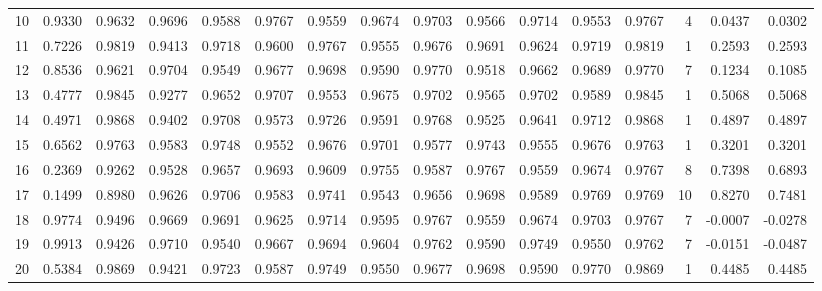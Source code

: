 \begin{tabular}{lrrrrrrrrrrrrrrr}
10  &      0.9330 &  0.9632 &  0.9696 &  0.9588 &  0.9767 &  0.9559 &  0.9674 &  0.9703 &  0.9566 &  0.9714 &   0.9553 &     0.9767 &      4 &                    0.0437 &                     0.0302 \\
11  &      0.7226 &  0.9819 &  0.9413 &  0.9718 &  0.9600 &  0.9767 &  0.9555 &  0.9676 &  0.9691 &  0.9624 &   0.9719 &     0.9819 &      1 &                    0.2593 &                     0.2593 \\
12  &      0.8536 &  0.9621 &  0.9704 &  0.9549 &  0.9677 &  0.9698 &  0.9590 &  0.9770 &  0.9518 &  0.9662 &   0.9689 &     0.9770 &      7 &                    0.1234 &                     0.1085 \\
13  &      0.4777 &  0.9845 &  0.9277 &  0.9652 &  0.9707 &  0.9553 &  0.9675 &  0.9702 &  0.9565 &  0.9702 &   0.9589 &     0.9845 &      1 &                    0.5068 &                     0.5068 \\
14  &      0.4971 &  0.9868 &  0.9402 &  0.9708 &  0.9573 &  0.9726 &  0.9591 &  0.9768 &  0.9525 &  0.9641 &   0.9712 &     0.9868 &      1 &                    0.4897 &                     0.4897 \\
15  &      0.6562 &  0.9763 &  0.9583 &  0.9748 &  0.9552 &  0.9676 &  0.9701 &  0.9577 &  0.9743 &  0.9555 &   0.9676 &     0.9763 &      1 &                    0.3201 &                     0.3201 \\
16  &      0.2369 &  0.9262 &  0.9528 &  0.9657 &  0.9693 &  0.9609 &  0.9755 &  0.9587 &  0.9767 &  0.9559 &   0.9674 &     0.9767 &      8 &                    0.7398 &                     0.6893 \\
17  &      0.1499 &  0.8980 &  0.9626 &  0.9706 &  0.9583 &  0.9741 &  0.9543 &  0.9656 &  0.9698 &  0.9589 &   0.9769 &     0.9769 &     10 &                    0.8270 &                     0.7481 \\
18  &      0.9774 &  0.9496 &  0.9669 &  0.9691 &  0.9625 &  0.9714 &  0.9595 &  0.9767 &  0.9559 &  0.9674 &   0.9703 &     0.9767 &      7 &                   -0.0007 &                    -0.0278 \\
19  &      0.9913 &  0.9426 &  0.9710 &  0.9540 &  0.9667 &  0.9694 &  0.9604 &  0.9762 &  0.9590 &  0.9749 &   0.9550 &     0.9762 &      7 &                   -0.0151 &                    -0.0487 \\
20  &      0.5384 &  0.9869 &  0.9421 &  0.9723 &  0.9587 &  0.9749 &  0.9550 &  0.9677 &  0.9698 &  0.9590 &   0.9770 &     0.9869 &      1 &                    0.4485 &                     0.4485 \\

\end{tabular}

